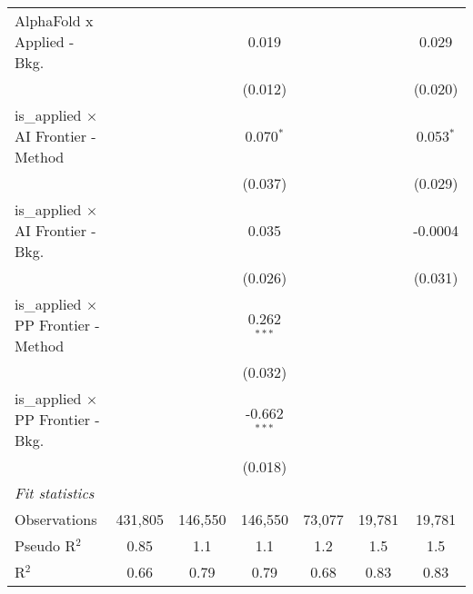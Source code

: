 \begin{tabular}{lcccccc}
   AlphaFold x Applied - Bkg.                  &                &                & 0.019          &                &               & 0.029\\   
                                               &                &                & (0.012)        &                &               & (0.020)\\   
   is\_applied $\times$ AI Frontier - Method   &                &                & 0.070$^{*}$    &                &               & 0.053$^{*}$\\   
                                               &                &                & (0.037)        &                &               & (0.029)\\   
   is\_applied $\times$ AI Frontier - Bkg.     &                &                & 0.035          &                &               & -0.0004\\   
                                               &                &                & (0.026)        &                &               & (0.031)\\   
   is\_applied $\times$ PP Frontier - Method   &                &                & 0.262$^{***}$  &                &               &   \\   
                                               &                &                & (0.032)        &                &               &   \\   
   is\_applied $\times$ PP Frontier - Bkg.     &                &                & -0.662$^{***}$ &                &               &   \\   
                                               &                &                & (0.018)        &                &               &   \\   
   \midrule
   \emph{Fit statistics}\\
   Observations                                & 431,805        & 146,550        & 146,550        & 73,077         & 19,781        & 19,781\\  
   Pseudo R$^2$                                & 0.85           & 1.1            & 1.1            & 1.2            & 1.5           & 1.5\\  
   R$^2$                                       & 0.66           & 0.79           & 0.79           & 0.68           & 0.83          & 0.83\\  
   

\end{tabular}
